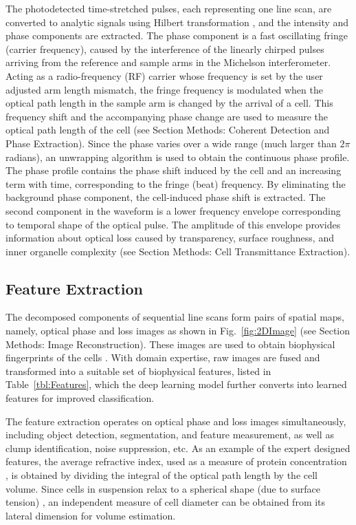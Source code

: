 \documentclass[aps,pra,reprint,superscriptaddress]{revtex4-1}
\begin{document}
The photodetected time-stretched pulses, each representing one line scan, are converted to analytic signals using Hilbert transformation \cite{king2009hilbert}, and the intensity and phase components are extracted. The phase component is a fast oscillating fringe (carrier frequency), caused by the interference of the linearly chirped pulses arriving from the reference and sample arms in the Michelson interferometer. Acting as a radio-frequency (RF) carrier whose frequency is set by the user adjusted arm length mismatch, the fringe frequency is modulated when the optical path length in the sample arm is changed by the arrival of a cell. This frequency shift and the accompanying phase change are used to measure the optical path length of the cell (see Section Methods: Coherent Detection and Phase Extraction). Since the phase varies over a wide range (much larger than $2 \pi$ radians), an unwrapping algorithm is used to obtain the continuous phase profile. The phase profile contains the phase shift induced by the cell and an increasing term with time, corresponding to the fringe (beat) frequency. By eliminating the background phase component, the cell-induced phase shift is extracted. The second component in the waveform is a lower frequency envelope corresponding to temporal shape of the optical pulse. The amplitude of this envelope provides information about optical loss caused by transparency, surface roughness, and inner organelle complexity (see Section Methods: Cell Transmittance Extraction). 

\subsection*{Feature Extraction}

The decomposed components of sequential line scans form pairs of spatial maps, namely, optical phase and loss images as shown in Fig.~\ref{fig:2DImage} (see Section Methods: Image Reconstruction). These images are used to obtain biophysical fingerprints of the cells \cite{mahjoubfar2013optically, driscoll2012automated}. With domain expertise, raw images are fused and transformed into a suitable set of biophysical features, listed in Table~\ref{tbl:Features}, which the deep learning model further converts into learned features for improved classification. 

The feature extraction operates on optical phase and loss images simultaneously, including object detection, segmentation, and feature measurement, as well as clump identification, noise suppression, etc. As an example of the expert designed features, the average refractive index, used as a measure of protein concentration \cite{barer1953refractometry}, is obtained by dividing the integral of the optical path length by the cell volume. Since cells in suspension relax to a spherical shape (due to surface tension) \cite{revel1974adhesion,whur1977substrate}, an independent measure of cell diameter can be obtained from its lateral dimension for volume estimation. 
\end{document}
